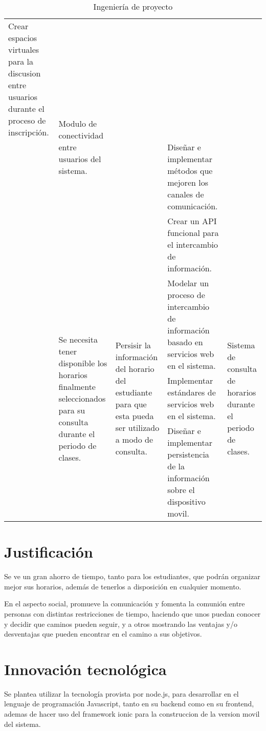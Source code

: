 \documentclass[letterpaper,11pt]{article}
\begin{document}
\begin{sidewaystable}
\begin{tabular}{|l|l|l|p{6.5cm}|l|}
Crear espacios virtuales para la discusion entre usuarios durante el proceso de
inscripción. &
\multirow{3}{2.5cm}{Modulo de conectividad entre usuarios del sistema.} \\
\cline{4-4}
& & & Diseñar e implementar métodos que mejoren los canales de comunicación. & \\
\cline{4-4}
& & & Crear un API funcional para el intercambio de información. & \\
\cline{2-5}
& \multirow{3}{3cm}{Se necesita tener disponible los horarios finalmente
seleccionados para su consulta durante el periodo de clases.} &
\multirow{3}{3.5cm}{Persisir la información del horario del estudiante para que
esta pueda ser utilizado a modo de consulta.} &
Modelar un proceso de intercambio de información basado en servicios web en el
sistema. &
\multirow{3}{2.5cm}{Sistema de consulta de horarios durante el periodo de
clases.} \\
\cline{4-4}
& & & Implementar estándares de servicios web en el sistema. & \\
\cline{4-4}
& & & Diseñar e implementar persistencia de la información sobre el dispositivo
movil. & \\
\hline
\end{tabular}
\caption{Ingeniería de proyecto}
\label{ingenieriadeproyecto}
\end{sidewaystable}

\section{Justificación}
Se ve un gran ahorro de tiempo, tanto para los estudiantes, que podrán
organizar mejor sus horarios, además de tenerlos a disposición en cualquier
momento.

En el aspecto social, promueve la comunicación y fomenta la comunión entre
personas con distintas restricciones de tiempo, haciendo que unos puedan conocer
y decidir que caminos pueden seguir, y a otros mostrando las ventajas y/o
desventajas que pueden encontrar en el camino a sus objetivos.

\section{Innovación tecnológica}
Se plantea utilizar la tecnología provista por node.js, para desarrollar en el
lenguaje de programación Javascript, tanto en su backend como en su frontend,
ademas de hacer uso del framework ionic para la construccion de la version movil
del sistema.
\end{document}
